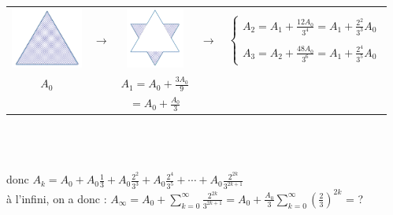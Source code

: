 \documentclass[a4paper,10pt]{report}
\begin{document}
\begin{tabular}{ccccc}
\includegraphics[height=2cm]{koch_a0.png} & $\rightarrow$ & \includegraphics[height=2cm]{koch_a1.png} & $\rightarrow$ & 
$
\left\lbrace
\begin{array}{l}
A_2 = A_1 + \frac{12A_0}{3^4}=A_1+\frac{2^2}{3^3}A_0 \\
\\
A_3 = A_2 + \frac{48A_0}{3^6}=A_1+\frac{2^4}{3^5}A_0
\end{array}\right.
 $\\
$A_0$ & & $A_1=A_0 + \frac{3A_0}{9}$ & & \\
&&$=A_0 + \frac{A_0}{3}$&&\\
\end{tabular} \\ \\ \\
donc $A_k=A_0+A_0\frac{1}{3}+A_0\frac{2^2}{3^3}+A_0\frac{2^4}{3^5}+\cdots + A_0\frac{2^{2k}}{3^{2k+1}}$\\
à l'infini, on a donc : $A_{\infty}=A_0+ \sum \limits_{k=0}^\infty \frac{2^{2k}}{3^{2k+1}} = A_0 + \frac{A_0}{3}\sum \limits_{k=0}^\infty \left( \frac{2}{3} \right)^{2k}$ = ?
\end{document}

